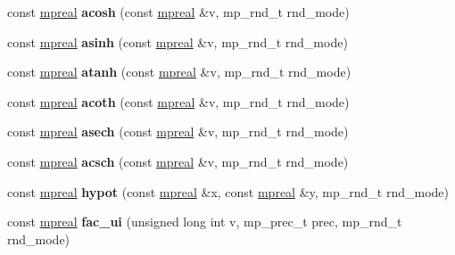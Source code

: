 \begin{DoxyCompactItemize}
\item 
\mbox{\label{classmpfr_1_1mpreal_acef951d04dd5b015c3239f660d902cd7}} 
const \hyperlink{classmpfr_1_1mpreal}{mpreal} {\bfseries acosh} (const \hyperlink{classmpfr_1_1mpreal}{mpreal} \&v, mp\+\_\+rnd\+\_\+t rnd\+\_\+mode)
\item 
\mbox{\label{classmpfr_1_1mpreal_afd92b24e00f032f4723ec776c89ba3e2}} 
const \hyperlink{classmpfr_1_1mpreal}{mpreal} {\bfseries asinh} (const \hyperlink{classmpfr_1_1mpreal}{mpreal} \&v, mp\+\_\+rnd\+\_\+t rnd\+\_\+mode)
\item 
\mbox{\label{classmpfr_1_1mpreal_a3dc2f54adfe973b4c22d63cea08786c1}} 
const \hyperlink{classmpfr_1_1mpreal}{mpreal} {\bfseries atanh} (const \hyperlink{classmpfr_1_1mpreal}{mpreal} \&v, mp\+\_\+rnd\+\_\+t rnd\+\_\+mode)
\item 
\mbox{\label{classmpfr_1_1mpreal_a519ca6fb3c0e0fb1c0df525470c10d0f}} 
const \hyperlink{classmpfr_1_1mpreal}{mpreal} {\bfseries acoth} (const \hyperlink{classmpfr_1_1mpreal}{mpreal} \&v, mp\+\_\+rnd\+\_\+t rnd\+\_\+mode)
\item 
\mbox{\label{classmpfr_1_1mpreal_aec6d46cabe844213104c36bf126e28b1}} 
const \hyperlink{classmpfr_1_1mpreal}{mpreal} {\bfseries asech} (const \hyperlink{classmpfr_1_1mpreal}{mpreal} \&v, mp\+\_\+rnd\+\_\+t rnd\+\_\+mode)
\item 
\mbox{\label{classmpfr_1_1mpreal_ad735a6effc0eb40d2038ef80551d4d16}} 
const \hyperlink{classmpfr_1_1mpreal}{mpreal} {\bfseries acsch} (const \hyperlink{classmpfr_1_1mpreal}{mpreal} \&v, mp\+\_\+rnd\+\_\+t rnd\+\_\+mode)
\item 
\mbox{\label{classmpfr_1_1mpreal_a7e7e7068e8b43b21dc9ec690de08b5d4}} 
const \hyperlink{classmpfr_1_1mpreal}{mpreal} {\bfseries hypot} (const \hyperlink{classmpfr_1_1mpreal}{mpreal} \&x, const \hyperlink{classmpfr_1_1mpreal}{mpreal} \&y, mp\+\_\+rnd\+\_\+t rnd\+\_\+mode)
\item 
\mbox{\label{classmpfr_1_1mpreal_a9e3b726154ad9628350de641fb11124d}} 
const \hyperlink{classmpfr_1_1mpreal}{mpreal} {\bfseries fac\+\_\+ui} (unsigned long int v, mp\+\_\+prec\+\_\+t prec, mp\+\_\+rnd\+\_\+t rnd\+\_\+mode)

\end{DoxyCompactItemize}
